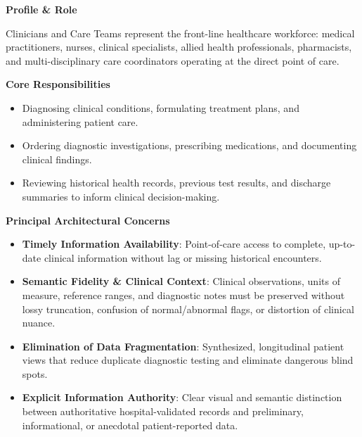 \par\medskip\textbf{Profile \& Role}\par


Clinicians and Care Teams represent the front-line healthcare workforce: medical practitioners, nurses, clinical specialists, allied health professionals, pharmacists, and multi-disciplinary care coordinators operating at the direct point of care.



\par\medskip\textbf{Core Responsibilities}\par


\begin{itemize}


\item Diagnosing clinical conditions, formulating treatment plans, and administering patient care.

\item Ordering diagnostic investigations, prescribing medications, and documenting clinical findings.

\item Reviewing historical health records, previous test results, and discharge summaries to inform clinical decision-making.

\end{itemize}


\par\medskip\textbf{Principal Architectural Concerns}\par


\begin{itemize}


\item \textbf{Timely Information Availability}: Point-of-care access to complete, up-to-date clinical information without lag or missing historical encounters.

\item \textbf{Semantic Fidelity \& Clinical Context}: Clinical observations, units of measure, reference ranges, and diagnostic notes must be preserved without lossy truncation, confusion of normal/abnormal flags, or distortion of clinical nuance.

\item \textbf{Elimination of Data Fragmentation}: Synthesized, longitudinal patient views that reduce duplicate diagnostic testing and eliminate dangerous blind spots.

\item \textbf{Explicit Information Authority}: Clear visual and semantic distinction between authoritative hospital-validated records and preliminary, informational, or anecdotal patient-reported data.

\end{itemize}

